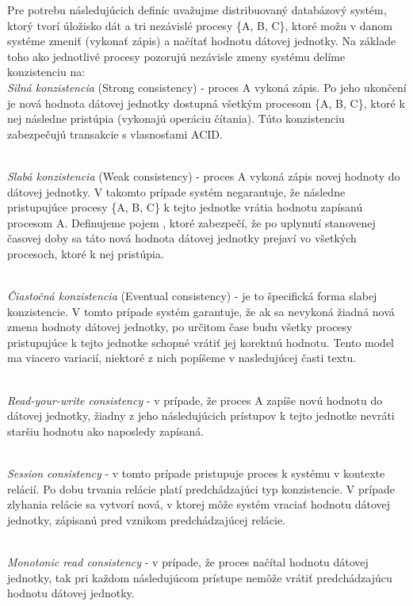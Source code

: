 \documentclass[11pt,twoside,a4paper]{book}
\begin{document}
Pre potrebu následujúcich definíc uvažujme distribuovaný databázový systém, ktorý tvorí úložisko dát a tri nezávislé procesy \{A, B, C\}, ktoré možu v danom systéme zmeniť (vykonať zápis) a načítať hodnotu dátovej jednotky. Na základe toho ako jednotlivé procesy pozorujú nezávisle zmeny systému delíme konzistenciu \cite{vogels2009eventually} na: \\

\noindent 
\emph{Silná konzistencia} (Strong consistency) - proces A vykoná zápis. Po jeho ukončení je nová hodnota dátovej jednotky dostupná všetkým procesom \{A, B, C\}, ktoré k nej následne pristúpia (vykonajú operáciu čítania). Túto konzistenciu zabezpečujú transakcie s vlasnosťami ACID.

\noindent 
\\
\emph{Slabá konzistencia} (Weak consistency) - proces A vykoná zápis novej hodnoty do dátovej jednotky. V takomto prípade systém negarantuje, že následne pristupujúce procesy \{A, B, C\} k tejto jednotke vrátia hodnotu zapísanú procesom A. Definujeme pojem , ktoré zabezpečí, že po uplynutí stanovenej časovej doby sa táto nová hodnota dátovej jednotky prejaví vo všetkých procesoch, ktoré k nej pristúpia.

\noindent 
\\
\emph{Čiastočná konzistencia} (Eventual consistency) - je to špecifická forma slabej konzistencie. V tomto prípade systém garantuje, že ak sa nevykoná žiadná nová zmena hodnoty dátovej jednotky, po určitom čase budu všetky procesy pristupujúce k tejto jednotke schopné vrátiť jej korektnú hodnotu. Tento model ma viacero variacií, niektoré z nich popíšeme v nasledujúcej časti textu.

\noindent 
\\
\emph{Read-your-write consistency} - v prípade, že proces A zapíše novú hodnotu do dátovej jednotky, žiadny z jeho následujúcich prístupov k tejto jednotke nevráti staršiu hodnotu ako naposledy zapísaná.

\noindent
\\
\emph{Session consistency} - v tomto prípade pristupuje proces k systému v kontexte relácií. Po dobu trvania relácie platí predchádzajúci typ konzistencie. V prípade zlyhania relácie sa vytvorí nová, v ktorej môže systém vraciať hodnotu dátovej jednotky, zápisanú pred vznikom predchádzajúcej relácie.

\noindent 
\\
\emph{Monotonic read consistency} - v prípade, že proces načítal hodnotu dátovej jednotky, tak pri každom následujúcom prístupe nemôže vrátiť predchádzajúcu hodnotu dátovej jednotky. \\
\end{document}

